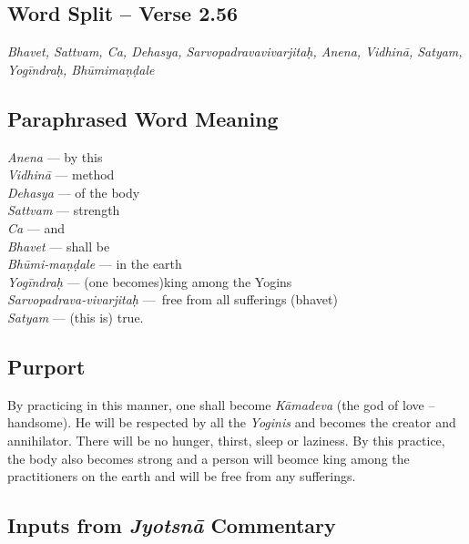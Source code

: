 \subsection*{Word Split -- Verse 2.56}


\textit{Bhavet, Sattvam, Ca, Dehasya, Sarvopadravavivarjitaḥ, Anena, Vidhinā, Satyam, Yogīndraḥ, Bhūmimaṇḍale}

\subsection*{Paraphrased Word Meaning}


\begin{multicols}{2}
\textit{Anena} --- by this\\
\textit{Vidhinā} --- method\\ 
\textit{Dehasya} --- of the body \\
\textit{Sattvam} --- strength \\
\textit{Ca} --- and \\
\textit{Bhavet} --- shall be \\
\textit{Bhūmi-maṇḍale} --- in the earth \\
\textit{Yogīndraḥ} --- (one becomes)king among the Yogins\\
\textit{Sarvopadrava-vivarjitaḥ} --- free from all sufferings (bhavet) \\
\textit{Satyam} --- (this is) true.
\end{multicols}

\subsection*{Purport}
\vspace{-5pt}

By practicing in this manner, one shall become \textit{Kāmadeva} (the god of love – handsome). He will be respected by all the \textit{Yoginis} and becomes the creator and annihilator. There will be no hunger, thirst, sleep or laziness. By this practice, the body also becomes strong and a person will beomce king among the practitioners on the earth and will be free from any sufferings.

\subsection*{Inputs from \textit{Jyotsnā} Commentary}
\vspace{-5pt}

